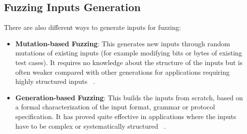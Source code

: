\subsection{Fuzzing Inputs Generation}
There are also different ways to generate inputs for fuzzing:
\begin{itemize}
    \item \textbf{Mutation-based Fuzzing}: This generates new inputs through random mutations of existing inputs (for example modifying bits or bytes of existing test cases). It requires no knowledge about the structure of the inputs but is often weaker compared with other generations for applications requiring highly structured inputs ~\cite{mutationgenerationbased}. 
    
    \item \textbf{Generation-based Fuzzing}: This builds the inputs from scratch, based on a formal characterization of the input format, grammar or protocol specification. It has proved quite effective in applications where the inputs have to be complex or systematically structured ~\cite{mutationgenerationbased}.
\end{itemize}

